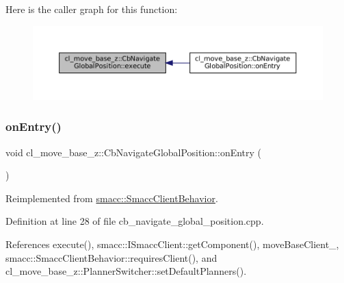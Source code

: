Here is the caller graph for this function\+:
\nopagebreak
\begin{figure}[H]
\begin{center}
\leavevmode
\includegraphics[width=350pt]{classcl__move__base__z_1_1CbNavigateGlobalPosition_a0b8525ea9e4388b27cb1f9b1e06a3b63_icgraph}
\end{center}
\end{figure}
\mbox{\label{classcl__move__base__z_1_1CbNavigateGlobalPosition_a66d8b0555ef2945bc108dcd5171be292}} 
\subsubsection{\texorpdfstring{on\+Entry()}{onEntry()}}
{\footnotesize\ttfamily void cl\+\_\+move\+\_\+base\+\_\+z\+::\+Cb\+Navigate\+Global\+Position\+::on\+Entry (\begin{DoxyParamCaption}{ }\end{DoxyParamCaption})\hspace{0.3cm}{\ttfamily [virtual]}}



Reimplemented from \hyperlink{classsmacc_1_1SmaccClientBehavior_a7962382f93987c720ad432fef55b123f}{smacc\+::\+Smacc\+Client\+Behavior}.



Definition at line 28 of file cb\+\_\+navigate\+\_\+global\+\_\+position.\+cpp.



References execute(), smacc\+::\+I\+Smacc\+Client\+::get\+Component(), move\+Base\+Client\+\_\+, smacc\+::\+Smacc\+Client\+Behavior\+::requires\+Client(), and cl\+\_\+move\+\_\+base\+\_\+z\+::\+Planner\+Switcher\+::set\+Default\+Planners().


